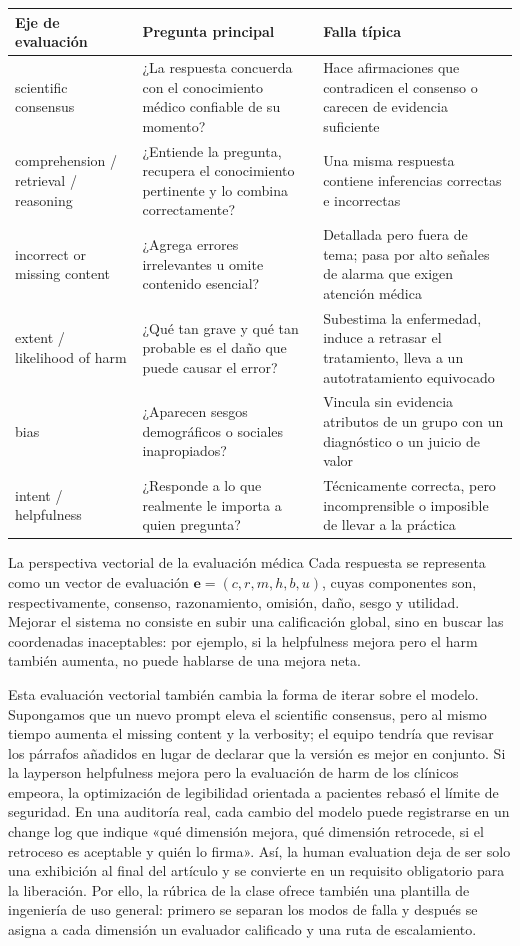 \documentclass[a4paper]{article}
\begin{document}
\begin{longtable}{@{}L{0.22\textwidth}L{0.32\textwidth}L{0.34\textwidth}@{}}
\toprule
Eje de evaluación & Pregunta principal & Falla típica \\
\midrule
scientific consensus & ¿La respuesta concuerda con el conocimiento médico confiable de su momento? & Hace afirmaciones que contradicen el consenso o carecen de evidencia suficiente \\
comprehension / retrieval / reasoning & ¿Entiende la pregunta, recupera el conocimiento pertinente y lo combina correctamente? & Una misma respuesta contiene inferencias correctas e incorrectas \\
incorrect or missing content & ¿Agrega errores irrelevantes u omite contenido esencial? & Detallada pero fuera de tema; pasa por alto señales de alarma que exigen atención médica \\
extent / likelihood of harm & ¿Qué tan grave y qué tan probable es el daño que puede causar el error? & Subestima la enfermedad, induce a retrasar el tratamiento, lleva a un autotratamiento equivocado \\
bias & ¿Aparecen sesgos demográficos o sociales inapropiados? & Vincula sin evidencia atributos de un grupo con un diagnóstico o un juicio de valor \\
intent / helpfulness & ¿Responde a lo que realmente le importa a quien pregunta? & Técnicamente correcta, pero incomprensible o imposible de llevar a la práctica \\
\bottomrule
\end{longtable}

\begin{importantbox}{La perspectiva vectorial de la evaluación médica}
Cada respuesta se representa como un vector de evaluación $\mathbf{e}=(c,r,m,h,b,u)$, cuyas componentes son, respectivamente, consenso, razonamiento, omisión, daño, sesgo y utilidad. Mejorar el sistema no consiste en subir una calificación global, sino en buscar las coordenadas inaceptables: por ejemplo, si la helpfulness mejora pero el harm también aumenta, no puede hablarse de una mejora neta.
\end{importantbox}

Esta evaluación vectorial también cambia la forma de iterar sobre el modelo. Supongamos que un nuevo prompt eleva el scientific consensus, pero al mismo tiempo aumenta el missing content y la verbosity; el equipo tendría que revisar los párrafos añadidos en lugar de declarar que la versión es mejor en conjunto. Si la layperson helpfulness mejora pero la evaluación de harm de los clínicos empeora, la optimización de legibilidad orientada a pacientes rebasó el límite de seguridad. En una auditoría real, cada cambio del modelo puede registrarse en un change log que indique «qué dimensión mejora, qué dimensión retrocede, si el retroceso es aceptable y quién lo firma». Así, la human evaluation deja de ser solo una exhibición al final del artículo y se convierte en un requisito obligatorio para la liberación. Por ello, la rúbrica de la clase ofrece también una plantilla de ingeniería de uso general: primero se separan los modos de falla y después se asigna a cada dimensión un evaluador calificado y una ruta de escalamiento.
\end{document}
